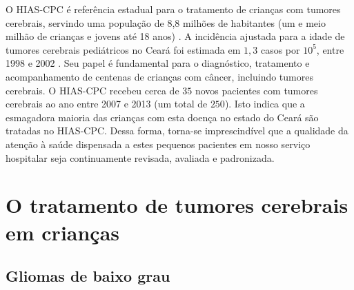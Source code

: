 \documentclass[11pt,a4paper,oldfontcommands]{memoir}
\begin{document}
O HIAS-CPC é referência estadual para o tratamento de crianças com tumores cerebrais, servindo uma população de 8,8 milhões de habitantes (um e meio milhão de crianças e jovens até 18 anos) \cite{estat}. A incidência ajustada para a idade de tumores cerebrais pediátricos no Ceará foi estimada em \(1,3\) casos por \(10^5\), entre 1998 e 2002 \cite{inca}. Seu papel é fundamental para o diagnóstico, tratamento e acompanhamento de centenas de crianças com câncer, incluindo tumores cerebrais. O HIAS-CPC recebeu cerca de \(35\) novos pacientes com tumores cerebrais ao ano entre 2007 e 2013 (um total de \(250\)). Isto indica que a esmagadora maioria das crianças com esta doença no estado do Ceará são tratadas no HIAS-CPC. Dessa forma, torna-se imprescindível que a qualidade da atenção à saúde dispensada a estes pequenos pacientes em nosso serviço hospitalar seja continuamente revisada, avaliada e padronizada.

\chapter{O tratamento de tumores cerebrais em crianças}

\section{Gliomas de baixo grau}
\end{document}
